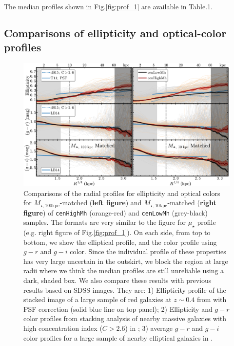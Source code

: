 \documentclass{emulateapj}
\def\rbcg{\texttt{cenHighMh}}
\def\nbcg{\texttt{cenLowMh}}
\def\minn{{$M_{\star,10\mathrm{kpc}}$}}
\def\mtot{{$M_{\star,100\mathrm{kpc}}$}}
\def\mden{{$\mu_{\star}$}}
\newcommand{\update}[1]{\textcolor{Bittersweet}{#1}}
\begin{document}
\begin{CJK*}{UTF8}{gbsn}
    \update{
    The median profiles shown in Fig.\ref{fig:prof_1} are available in 
    Table.1.}


\subsection{Comparisons of ellipticity and optical-color profiles}
    \label{ssec:ell_color}
    
  \begin{figure}[t!]
      \centering 
      \includegraphics[width=\textwidth]{fig/redbcg_discussion_2}
      \caption{Comparisons of the radial profiles for ellipticity and optical colors 
      	for \mtot{}-matched (\textbf{left figure}) and \minn{}-matched 
      	(\textbf{right figure}) of \rbcg{} (orange-red) and \nbcg{} (grey-black) samples. 
        The formats are very similar to the figure for \mden{} profile 
        (e.g. right figure of Fig.\ref{fig:prof_1}). 
        On each side, from top to bottom, we show the elliptical profile, and the 
        color profile using $g-r$ and $g-i$ color. 
        Since the individual profile of these properties has very large uncertain in the 
        outskirt, we block the region at large radii where we think the median profiles 
        are still unreliable using a dark, shaded box.
        We also compare these results with previous results based on SDSS images. 
        They are: 
        1) Ellipticity profile of the stacked image of a large sample of red galaxies at 
        $z\sim 0.4$ from \citet{Tal2011} with PSF correction 
        (solid blue line on top panel); 
        2) Ellipticity and $g-r$ color profiles from stacking analysis of nearby massive 
        galaxies with high concentration index ($C>2.6$) in \citet[][blue dash lines 
        on the top and middle panels]{DSouza2014}; 
        3) average $g-r$ and $g-i$ color profiles for a large sample of nearby 
        elliptical galaxies in \citet[][blue, solid lines on the middle and bottom 
        panels]{LaBarbera2010}.}
      \label{fig:ell_color}
  \end{figure}
    

\end{CJK*}
\end{document}
